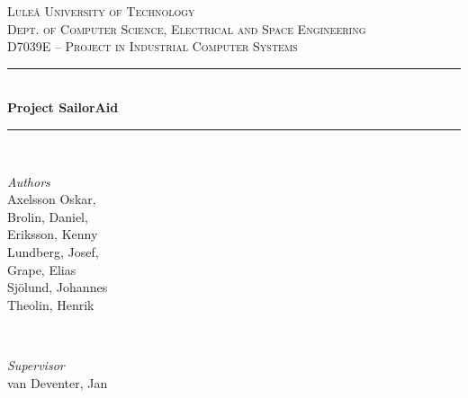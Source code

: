 ﻿\newcommand{\HRule}{\rule{\linewidth}{0.5mm}} %

\center %


\textsc{\LARGE Luleå University of Technology}\\[1.5cm] %

\textsc{\Large Dept. of Computer Science, Electrical and Space Engineering}\\[0.5cm] %

\textsc{\large D7039E -- Project in Industrial Computer Systems}\\[0.5cm] %


\HRule\\[0.8cm]

{\huge\bfseries Project SailorAid}\\[0.4cm] %

\HRule\\[1.5cm]

\begin{minipage}{0.4\textwidth}
	\begin{flushleft}
		\large
		\textit{Authors}\\
		Axelsson Oskar, \\ 
		Brolin, Daniel, \\ 
		Eriksson, Kenny \\ 
		Lundberg, Josef, \\ 
		Grape, Elias \\ 
		Sjölund, Johannes \\
		Theolin, Henrik
	\end{flushleft}
\end{minipage}
~
\begin{minipage}{0.4\textwidth}
	\begin{flushright}
		\large
		\textit{Supervisor}\\
		van Deventer, Jan
	\end{flushright}
\end{minipage}

